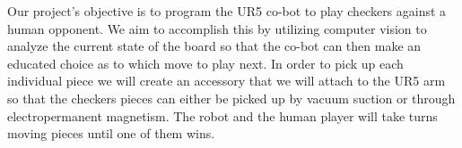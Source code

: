 
Our project's objective is to program the UR5 co-bot to play checkers against a human opponent. We aim to accomplish this by utilizing computer vision to analyze the current state of the board so that the co-bot can then make an educated choice as to which move to play next. In order to pick up each individual piece we will create an accessory that we will attach to the UR5 arm so that the checkers pieces can either be picked up by vacuum suction or through electropermanent magnetism. The robot and the human player will take turns moving pieces until one of them wins.
